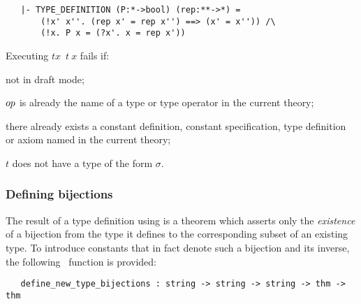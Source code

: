 \begin{hol}\begin{verbatim}
   |- TYPE_DEFINITION (P:*->bool) (rep:**->*) =
       (!x' x''. (rep x' = rep x'') ==> (x' = x'')) /\
       (!x. P x = (?x'. x = rep x'))
\end{verbatim}\end{hol}

\noindent Executing $t$$x$\ $t\ x$\ml{)} fails if:
\begin{myenumerate}
\item not in draft mode;
\item ${\sl op}$ is already the name of a type or type operator
in the current theory;
\item there already exists a constant definition, constant specification,
type definition or axiom named   in the current theory;
\item $t$ does not have a type of the form $\sigma$\ml{->bool}.
\end{myenumerate}

\subsubsection{Defining bijections}

The result of a type definition using \ml{new\_type\_definition} is a theorem
which asserts only the {\it existence\/} of a
bijection
from the type it defines to the corresponding subset of an existing type.  To
introduce constants that in fact denote such a bijection and its inverse, the
following \ML\ function is provided:

\begin{boxed}
\begin{verbatim}
   define_new_type_bijections : string -> string -> string -> thm -> thm
\end{verbatim}\end{boxed}

